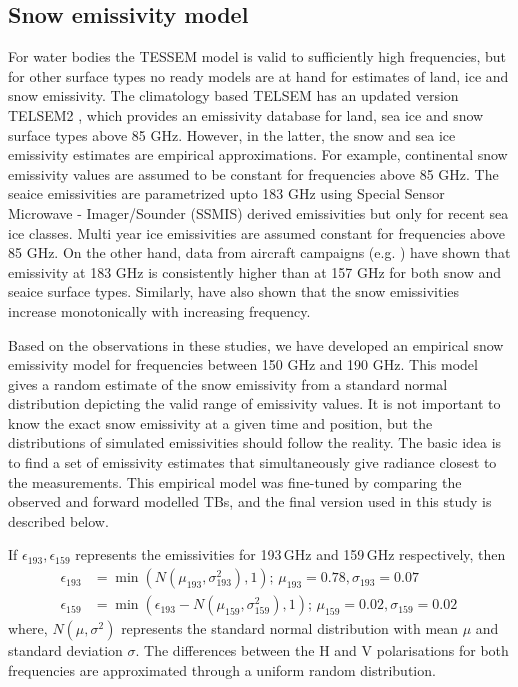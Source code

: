 \documentclass[amt, manuscript]{copernicus}
\begin{document}
\subsection{Snow emissivity model}
\label{sec:snow_emissivity}

For water bodies the TESSEM model is valid to sufficiently high frequencies, but for other surface types no ready models are at hand for estimates of land, ice and snow emissivity. The climatology based TELSEM has an updated version TELSEM2 \citep{wang:surfa:17}, which provides an emissivity database for land, sea ice and snow surface types above 85 GHz. However, in the latter,  the snow and sea ice emissivity estimates are empirical approximations. For example, continental snow emissivity values are assumed to be constant for frequencies above 85 GHz. The seaice emissivities are parametrized upto 183 GHz using Special Sensor Microwave - Imager/Sounder (SSMIS) derived emissivities \citep{boukabara2011mirs} but only for recent sea ice classes. Multi year ice emissivities are assumed constant for frequencies above 85 GHz. On the other hand, data from aircraft campaigns (e.g. \citet{hewison:2002:airbo}) have shown that emissivity at 183 GHz is consistently higher than at 157 GHz for both snow and seaice surface types. Similarly, \citet{harlow:2012:tundr} have also shown that the snow emissivities increase monotonically with increasing frequency. 

Based on the observations in these studies, we have developed an empirical snow emissivity model for frequencies between 150\,\,GHz and 190\,\,GHz. This model gives a random estimate of the snow emissivity from a standard normal distribution depicting the valid range of emissivity values. It is not important to know the exact snow emissivity at a given time and position, but the distributions of simulated emissivities should follow the reality. The basic idea is to find a set of emissivity estimates that simultaneously give radiance closest to the measurements. This empirical model was fine-tuned by comparing the observed and forward modelled TBs, and the final version used in this study is described below. 

If $\epsilon_{193}, \epsilon_{159}$ represents the emissivities for 193\,GHz and
159\,GHz respectively, then
\begin{align}
\epsilon_{193}& = \min({N(\mu_{193}, \sigma_{193}^{2}), 1});\, \mu_{193} = 0.78, \sigma_{193} = 0.07 \label{eq:1}\\
\epsilon_{159}& = \min(\epsilon_{193} - N(\mu_{159}, \sigma_{159}^{2}), 1) ;\,  \mu_{159} = 0.02, \sigma_{159} = 0.02\,\label{eq:2}
\end{align}
where, $N(\mu, \sigma^{2})$ represents the standard normal distribution with
mean $\mu$ and standard deviation $\sigma$. The differences between the
H  and V polarisations for both frequencies are 
approximated through a uniform random distribution.
\end{document}
